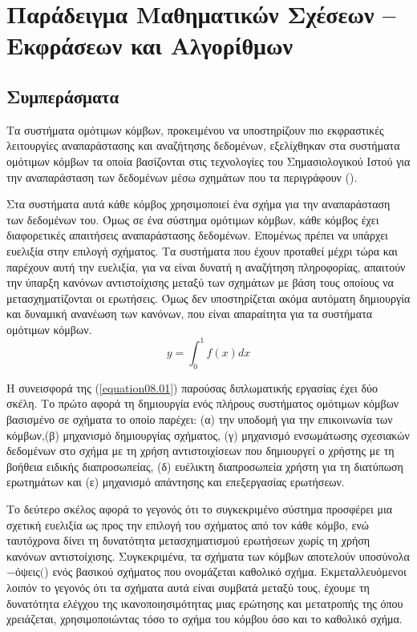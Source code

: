 \chapter{Παράδειγμα Μαθηματικών Σχέσεων -- Εκφράσεων και Αλγορίθμων}

\section{Συμπεράσματα}
Τα συστήματα ομότιμων κόμβων, προκειμένου να υποστηρίζουν πιο
εκφραστικές λειτουργίες αναπαράστασης και αναζήτησης δεδομένων,
εξελίχθηκαν στα συστήματα ομότιμων κόμβων τα οποία βασίζονται στις
τεχνολογίες του Σημασιολογικού Ιστού για την αναπαράσταση των
δεδομένων μέσω σχημάτων που τα περιγράφουν ().

Στα συστήματα αυτά κάθε   κόμβος χρησιμοποιεί ένα σχήμα για την 
αναπαράσταση των δεδομένων του. Όμως σε ένα σύστημα ομότιμων
κόμβων, κάθε κόμβος έχει διαφορετικές απαιτήσεις αναπαράστασης
δεδομένων. Επομένως πρέπει να υπάρχει ευελιξία στην επιλογή 
σχήματος. Τα συστήματα που έχουν προταθεί μέχρι τώρα και παρέχουν
αυτή την ευελιξία, για να είναι δυνατή η αναζήτηση πληροφορίας,
απαιτούν την ύπαρξη κανόνων αντιστοίχισης μεταξύ των σχημάτων με
βάση τους οποίους να μετασχηματίζονται οι ερωτήσεις. Όμως δεν
υποστηρίζεται ακόμα αυτόματη δημιουργία και δυναμική ανανέωση των
κανόνων, που είναι απαραίτητα για τα συστήματα ομότιμων κόμβων.
\begin{equation}
	y=\int_0^1f(x)dx
	\label{equation08.01}
\end{equation}

Η συνεισφορά της (\ref{equation08.01}) παρούσας διπλωματικής εργασίας έχει δύο σκέλη. Το
πρώτο αφορά τη δημιουργία ενός πλήρους συστήματος ομότιμων κόμβων
βασισμένο σε σχήματα  το οποίο παρέχει: (α) την υποδομή
για την επικοινωνία των κόμβων,(β) μηχανισμό δημιουργίας σχήματος,
(γ) μηχανισμό ενσωμάτωσης σχεσιακών δεδομένων στο σχήμα με τη
χρήση αντιστοιχίσεων που δημιουργεί ο χρήστης με τη βοήθεια
ειδικής διαπροσωπείας, (δ) ευέλικτη διαπροσωπεία χρήστη για τη
διατύπωση ερωτημάτων και (ε) μηχανισμό απάντησης και επεξεργασίας
ερωτήσεων.

Το δεύτερο σκέλος αφορά το γεγονός ότι το συγκεκριμένο σύστημα
προσφέρει μια σχετική ευελιξία ως προς την επιλογή του σχήματος
από τον κάθε κόμβο, ενώ ταυτόχρονα δίνει τη δυνατότητα
μετασχηματισμού ερωτήσεων χωρίς τη χρήση κανόνων αντιστοίχισης.
Συγκεκριμένα, τα σχήματα των κόμβων αποτελούν
υποσύνολα$-$όψεις$($) ενός βασικού σχήματος που
ονομάζεται καθολικό σχήμα. Εκμεταλλευόμενοι λοιπόν το γεγονός ότι
τα σχήματα αυτά είναι συμβατά μεταξύ τους, έχουμε τη δυνατότητα
ελέγχου της ικανοποιησιμότητας μιας ερώτησης και μετατροπής της
όπου χρειάζεται, χρησιμοποιώντας τόσο το σχήμα του κόμβου όσο και
το καθολικό σχήμα.

